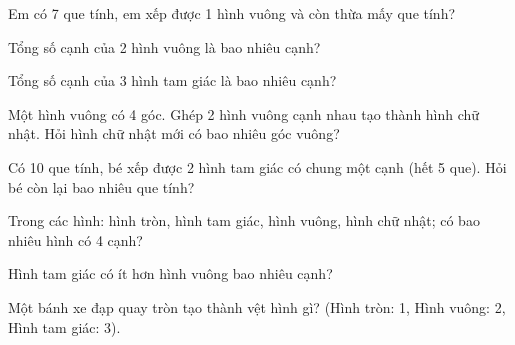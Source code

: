 \begin{ex}
Em có 7 que tính, em xếp được 1 hình vuông và còn thừa mấy que tính?
\end{ex}

\begin{ex}
Tổng số cạnh của 2 hình vuông là bao nhiêu cạnh?
\end{ex}

\begin{ex}
Tổng số cạnh của 3 hình tam giác là bao nhiêu cạnh?
\end{ex}

\begin{ex}
Một hình vuông có 4 góc. Ghép 2 hình vuông cạnh nhau tạo thành hình chữ nhật. Hỏi hình chữ nhật mới có bao nhiêu góc vuông?
\end{ex}

\begin{ex}
Có 10 que tính, bé xếp được 2 hình tam giác có chung một cạnh (hết 5 que). Hỏi bé còn lại bao nhiêu que tính?
\end{ex}

\begin{ex}
Trong các hình: hình tròn, hình tam giác, hình vuông, hình chữ nhật; có bao nhiêu hình có 4 cạnh?
\end{ex}

\begin{ex}
Hình tam giác có ít hơn hình vuông bao nhiêu cạnh?
\end{ex}

\begin{ex}
Một bánh xe đạp quay tròn tạo thành vệt hình gì? (Hình tròn: 1, Hình vuông: 2, Hình tam giác: 3).
\end{ex}

